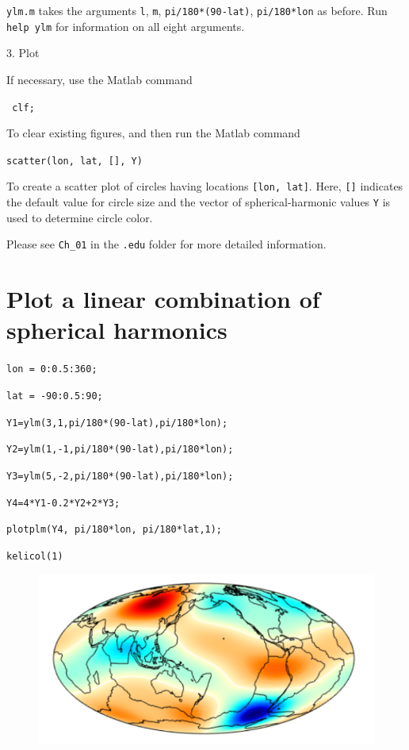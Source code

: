 \documentclass{article}
\begin{document}
\verb+ylm.m+ takes the arguments \verb+l+, \verb+m+, \verb+pi/180*(90-lat)+, \verb+pi/180*lon+ as before. Run \verb+help ylm+ for information on all eight arguments. 

3. Plot

If necessary, use the Matlab command 

\verb+ clf;+

To clear existing figures, and then run the Matlab command

\verb+scatter(lon, lat, [], Y)+

To create a scatter plot of circles having locations \verb+[lon, lat]+. Here, \verb+[]+ indicates the default value for circle size and the vector of spherical-harmonic values \verb+Y+ is used to determine circle color. 

Please see \verb+Ch_01+ in the \verb+.edu+ folder for more detailed information.

\section{Plot a linear combination of spherical harmonics}

\setlength{\parskip}{.1mm}

\verb+lon = 0:0.5:360;+

\verb+lat = -90:0.5:90;+

\verb+Y1=ylm(3,1,pi/180*(90-lat),pi/180*lon);+

\verb+Y2=ylm(1,-1,pi/180*(90-lat),pi/180*lon);+

\verb+Y3=ylm(5,-2,pi/180*(90-lat),pi/180*lon);+

\verb!Y4=4*Y1-0.2*Y2+2*Y3;!

\verb+plotplm(Y4, pi/180*lon, pi/180*lat,1);+

\verb!kelicol(1)!
\begin{figure}[H]
\includegraphics[scale=1]{linear_combination}
\end{figure}
\end{document}
